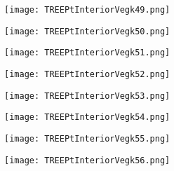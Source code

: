 \documentclass[pdf]{beamer}
\begin{document}
\begin{frame}
\begin{figure}[!h]
\centering
\texttt{[image: TREEPtInteriorVegk49.png]}
\end{figure}
\end{frame}

\begin{frame}
\begin{figure}[!h]
\centering
\texttt{[image: TREEPtInteriorVegk50.png]}
\end{figure}
\end{frame}

\begin{frame}
\begin{figure}[!h]
\centering
\texttt{[image: TREEPtInteriorVegk51.png]}
\end{figure}
\end{frame}

\begin{frame}
\begin{figure}[!h]
\centering
\texttt{[image: TREEPtInteriorVegk52.png]}
\end{figure}
\end{frame}

\begin{frame}
\begin{figure}[!h]
\centering
\texttt{[image: TREEPtInteriorVegk53.png]}
\end{figure}
\end{frame}

\begin{frame}
\begin{figure}[!h]
\centering
\texttt{[image: TREEPtInteriorVegk54.png]}
\end{figure}
\end{frame}

\begin{frame}
\begin{figure}[!h]
\centering
\texttt{[image: TREEPtInteriorVegk55.png]}
\end{figure}
\end{frame}

\begin{frame}
\begin{figure}[!h]
\centering
\texttt{[image: TREEPtInteriorVegk56.png]}
\end{figure}
\end{frame}
\end{document}
